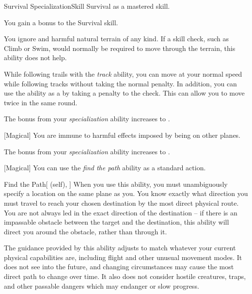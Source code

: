     \begin{feat}{Survival Specialization}{Skill}
        \featpre Survival as a mastered skill.

         You gain a  bonus to the Survival skill.

         You ignore  and harmful natural terrain of any kind.
        If a skill check, such as Climb or Swim, would normally be required to move through the terrain, this ability does not help.

        While following trails with the \textit{track} ability, you can move at your normal speed while following tracks without taking the normal  penalty.
        In addition, you can use the ability as a  by taking a  penalty to the check.
        This can allow you to move twice in the same round.

         The bonus from your \textit{specialization} ability increases to .

        [Magical] You are immune to harmful effects imposed by being on other planes.

         The bonus from your \textit{specialization} ability increases to .

        [Magical] You can use the \textit{find the path} ability as a standard action.
        \begin{attuneability}{Find the Path}[ (self), ]
            When you use this ability, you must unambiguously specify a location on the same plane as you.
            You know exactly what direction you must travel to reach your chosen destination by the most direct physical route.
            You are not always led in the exact direction of the destination -- if there is an impassable obstacle between the target and the destination, this ability will direct you around the obstacle, rather than through it.

            The guidance provided by this ability adjusts to match whatever your current physical capabilities are, including flight and other unusual movement modes. It does not see into the future, and changing circumstances may cause the most direct path to change over time.
            It also does not consider hostile creatures, traps, and other passable dangers which may endanger or slow progress.
        \end{attuneability}
    \end{feat}

